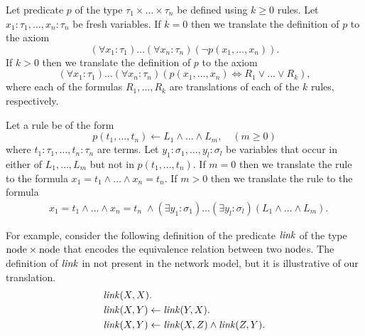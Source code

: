 Let predicate $p$ of the type $\tau_1\times\ldots\times\tau_n$ be defined using $k\ge0$ rules. Let $x_1:\tau_1,\ldots,x_n:\tau_n$ be fresh variables. If $k=0$ then we translate the definition of $p$ to the axiom $$(\forall x_1:\tau_1)\ldots(\forall x_n:\tau_n)(\neg p(x_1,\ldots,x_n)).$$ If $k>0$ then we translate the definition of $p$ to the axiom $$(\forall x_1:\tau_1)\ldots(\forall x_n:\tau_n)(p(x_1,\ldots,x_n)\Leftrightarrow R_1\vee\ldots\vee R_k),$$ where each of the formulas $R_1,\ldots,R_k$ are translations of each of the $k$ rules, respectively.

Let a rule be of the form $$p(t_1,\ldots,t_n)\leftarrow L_1\wedge\ldots\wedge L_m,\quad(m\ge0)$$ where $t_1:\tau_1,\ldots,t_n:\tau_n$ are terms. Let $y_1:\sigma_1,\ldots,y_l:\sigma_l$ be variables that occur in either of $L_1,\ldots,L_m$ but not in $p(t_1,\ldots,t_n)$. If $m=0$ then we translate the rule to the formula $x_1=t_1\wedge\ldots\wedge x_n=t_n.$ If $m>0$ then we translate the rule to the formula
\begin{equation*}
\begin{aligned}
&x_1=t_1\wedge\ldots\wedge x_n=t_n\;\wedge(\exists y_1:\sigma_1)\ldots(\exists y_l:\sigma_l)(L_1\wedge\ldots\wedge L_m).
\end{aligned}
\end{equation*}


For example, consider the following definition of the predicate $\mathit{link}$ of the type $\mathrm{node} \times \mathrm{node}$ that encodes the equivalence relation between two $\mathrm{node}$s. The definition of $\mathit{link}$ in not present in the network model, but it is illustrative of our translation.
\begin{equation*}
\begin{aligned}
&\mathit{link}(X,X).\\
&\mathit{link}(X,Y)\leftarrow\mathit{link}(Y,X).\\
&\mathit{link}(X,Y)\leftarrow\mathit{link}(X,Z)\wedge\mathit{link}(Z,Y).
\end{aligned}
\end{equation*}

